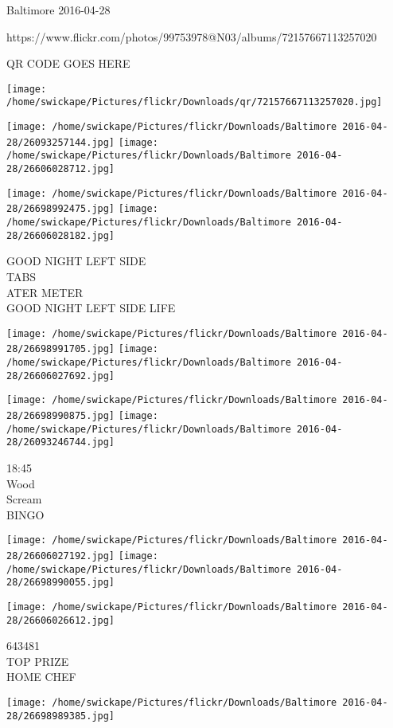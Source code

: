 \documentclass[10pt,letterpaper]{article}
\begin{document}
Baltimore 2016-04-28

https://www.flickr.com/photos/99753978@N03/albums/72157667113257020

QR CODE GOES HERE

\texttt{[image: /home/swickape/Pictures/flickr/Downloads/qr/72157667113257020.jpg]}
\pagebreak

\texttt{[image: /home/swickape/Pictures/flickr/Downloads/Baltimore 2016-04-28/26093257144.jpg]}
\texttt{[image: /home/swickape/Pictures/flickr/Downloads/Baltimore 2016-04-28/26606028712.jpg]}

\texttt{[image: /home/swickape/Pictures/flickr/Downloads/Baltimore 2016-04-28/26698992475.jpg]}
\texttt{[image: /home/swickape/Pictures/flickr/Downloads/Baltimore 2016-04-28/26606028182.jpg]}

GOOD NIGHT LEFT SIDE\\
TABS\\
ATER METER\\
GOOD NIGHT LEFT SIDE LIFE\\
\pagebreak

\texttt{[image: /home/swickape/Pictures/flickr/Downloads/Baltimore 2016-04-28/26698991705.jpg]}
\texttt{[image: /home/swickape/Pictures/flickr/Downloads/Baltimore 2016-04-28/26606027692.jpg]}

\texttt{[image: /home/swickape/Pictures/flickr/Downloads/Baltimore 2016-04-28/26698990875.jpg]}
\texttt{[image: /home/swickape/Pictures/flickr/Downloads/Baltimore 2016-04-28/26093246744.jpg]}

18:45\\
Wood\\
Scream\\
BINGO\\
\pagebreak

\texttt{[image: /home/swickape/Pictures/flickr/Downloads/Baltimore 2016-04-28/26606027192.jpg]}
\texttt{[image: /home/swickape/Pictures/flickr/Downloads/Baltimore 2016-04-28/26698990055.jpg]}

\texttt{[image: /home/swickape/Pictures/flickr/Downloads/Baltimore 2016-04-28/26606026612.jpg]}

643481\\
TOP PRIZE\\
HOME CHEF\\
\pagebreak

\texttt{[image: /home/swickape/Pictures/flickr/Downloads/Baltimore 2016-04-28/26698989385.jpg]}
\end{document}
